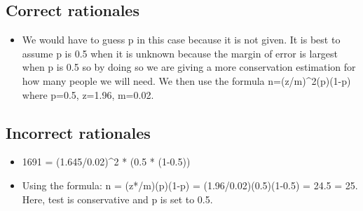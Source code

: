 \documentclass[letterpaper,9pt,twoside,printwatermark=false]{pinp}
\providecommand{\tightlist}{%
  \setlength{\itemsep}{0pt}\setlength{\parskip}{0pt}}
\begin{document}
\subsection{Correct rationales}\label{correct-rationales-8}

\begin{itemize}
\tightlist
\item
  We would have to guess p in this case because it is not given. It is
  best to assume p is 0.5 when it is unknown because the margin of error
  is largest when p is 0.5 so by doing so we are giving a more
  conservation estimation for how many people we will need. We then use
  the formula n=(z/m)\^{}2(p)(1-p) where p=0.5, z=1.96, m=0.02.
\end{itemize}

\subsection{Incorrect rationales}\label{incorrect-rationales-8}

\begin{itemize}
\tightlist
\item
  1691 = (1.645/0.02)\^{}2 * (0.5 * (1-0.5))
\item
  Using the formula: n = (z*/m)(p)(1-p) = (1.96/0.02)(0.5)(1-0.5) = 24.5
  = 25. Here, test is conservative and p is set to 0.5.
\end{itemize}





\end{document}
